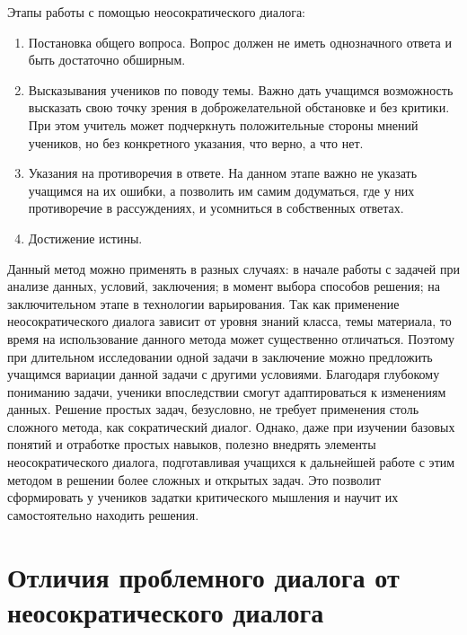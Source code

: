 \documentclass[a4paper,14pt,russian]{extreport}
\begin{document}
\begin{center}
Этапы работы с помощью неосократического диалога:
\end{center}

\begin{enumerate}
    
\item	Постановка общего вопроса.
Вопрос должен не иметь однозначного ответа и быть достаточно обширным.
\item	Высказывания учеников по поводу темы.
Важно дать учащимся возможность высказать свою точку зрения в доброжелательной обстановке и без критики. При этом учитель может подчеркнуть положительные стороны мнений учеников, но без конкретного указания, что верно, а что нет.
\item	Указания на противоречия в ответе.
На данном этапе важно не указать учащимся на их ошибки, а позволить им самим додуматься, где у них противоречие в рассуждениях, и усомниться в собственных ответах.
\item	Достижение истины.

\end{enumerate}

Данный метод можно применять в разных случаях: в начале работы с задачей при анализе данных, условий, заключения; в момент выбора способов решения; на заключительном этапе в технологии варьирования. Так как применение неосократического диалога зависит от уровня знаний класса, темы материала, то время на использование данного метода может существенно отличаться. Поэтому при длительном исследовании одной задачи в заключение можно предложить учащимся вариации данной задачи с другими условиями. Благодаря глубокому пониманию задачи, ученики впоследствии смогут адаптироваться к изменениям данных. Решение простых задач, безусловно, не требует применения столь сложного метода, как сократический диалог. Однако, даже при изучении базовых понятий и отработке простых навыков, полезно внедрять элементы неосократического диалога, подготавливая учащихся к дальнейшей работе с этим методом в решении более сложных и открытых задач. Это позволит сформировать у учеников задатки критического мышления и научит их самостоятельно находить решения.

\chapter*{Отличия проблемного диалога от неосократического диалога}
\end{document}
